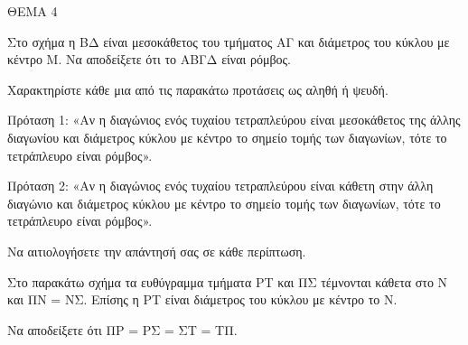 
ΘΕΜΑ 4

\begin{alist}
\item Στο σχήμα η ΒΔ είναι μεσοκάθετος του τμήματος ΑΓ και διάμετρος του κύκλου με κέντρο Μ. Να αποδείξετε ότι το ΑΒΓΔ είναι ρόμβος. 



\item Χαρακτηρίστε κάθε μια από τις παρακάτω προτάσεις ως αληθή ή ψευδή.

Πρόταση 1: «Αν η διαγώνιος ενός τυχαίου τετραπλεύρου είναι μεσοκάθετος της άλλης διαγωνίου και διάμετρος κύκλου με κέντρο το σημείο τομής των διαγωνίων, τότε το τετράπλευρο είναι ρόμβος».

Πρόταση 2: «Αν η διαγώνιος ενός τυχαίου τετραπλεύρου είναι κάθετη στην άλλη διαγώνιο και διάμετρος κύκλου με κέντρο το σημείο τομής των διαγωνίων, τότε το τετράπλευρο είναι ρόμβος».

Να αιτιολογήσετε την απάντησή σας σε κάθε περίπτωση.


\item Στο παρακάτω σχήμα τα ευθύγραμμα τμήματα ΡΤ και ΠΣ τέμνονται κάθετα στο Ν και ΠΝ = ΝΣ. Επίσης η ΡΤ είναι διάμετρος του κύκλου με κέντρο το Ν.

Να αποδείξετε ότι ΠΡ = ΡΣ = ΣΤ = ΤΠ. 


\end{alist}
